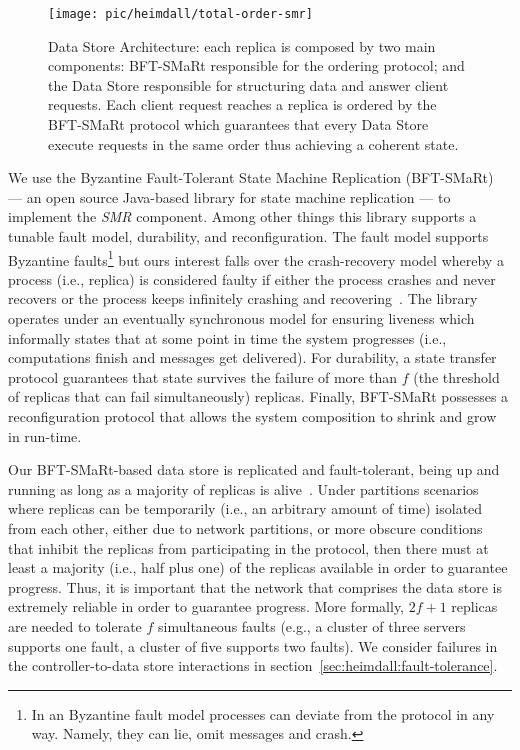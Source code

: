 \begin{figure}
  \centering
  \texttt{[image: pic/heimdall/total-order-smr]}
  \caption[Data Store Architecture]{Data Store Architecture: each replica is composed by two main components: BFT-SMaRt responsible for the ordering protocol; and the Data Store responsible for structuring data and answer client requests. Each client request reaches a replica is ordered by the BFT-SMaRt protocol which guarantees that every Data Store execute  requests in the same order thus achieving a coherent state.}
  \label{fig:design:smr}
\end{figure}

We use the Byzantine Fault-Tolerant State Machine Replication (BFT-SMaRt) --- an open source Java-based library for state machine replication --- to implement the \emph{SMR} component. 
Among other things this library supports a tunable fault model, durability, and reconfiguration. 
The fault model supports Byzantine faults\footnote{In an Byzantine fault model processes can deviate from the protocol in any way.  Namely, they can lie, omit messages and crash.}   but ours interest falls over the crash-recovery model whereby a process (i.e., replica) is considered faulty if either the process crashes and never recovers or the process keeps infinitely crashing and recovering~\cite{2011itra.book.....C}. 
The library operates under an eventually synchronous model for ensuring liveness which informally states that at some point in time the system progresses (i.e., computations finish and messages get delivered). 
For durability, a state transfer protocol guarantees that state survives the failure of more than $f$ (the threshold of replicas that can fail simultaneously) replicas. 
Finally, BFT-SMaRt possesses a reconfiguration protocol that allows the system composition to shrink and grow in run-time. 

Our  BFT-SMaRt-based data store  is replicated and fault-tolerant, being up and running as long as a majority of replicas is alive~\cite{Lam98}.
Under partitions scenarios where replicas can be temporarily  (i.e., an arbitrary amount of time)  isolated from each other, either due to network partitions, or more obscure conditions that inhibit the replicas from participating in the protocol, then there must at least a majority (i.e., half plus one) of the replicas available in order to guarantee progress. 
Thus, it is important that the network that comprises the data store is extremely reliable in order to guarantee  progress.
More formally, $2f+1$ replicas are needed to tolerate $f$ simultaneous faults (e.g., a cluster of three servers supports one fault, a cluster of five supports two faults). 
We consider failures in the controller-to-data store interactions in section~\ref{sec:heimdall:fault-tolerance}. 

